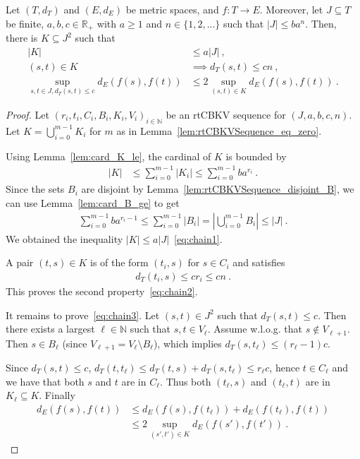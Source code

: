 \begin{lemma}\label{lem:chain}
Let $(T,d_T)$ and $(E,d_E)$ be metric spaces, and $f : T \to E$.
Moreover, let $J \subseteq T$ be finite, $a,b,c \in \mathbb R_+$ with $a \ge 1$ and $n \in \{1, 2, ...\}$ such that $|J| \le b a^n$.
Then, there is $K \subseteq J^2$ such that
\begin{align}
  |K|
  & \le a |J|
  \:, \label{eq:chain1} \\
  (s,t) \in K
  & \implies d_T(s,t) \le c n
  \:, \label{eq:chain2} \\
  \sup_{s,t\in J, d_T(s,t) \le c} d_E(f(s), f(t))
  & \le 2 \sup_{(s,t) \in K} d_E(f(s), f(t))
  \: . \label{eq:chain3}
\end{align}
\end{lemma}

\begin{proof}
Let $(r_i, t_i, C_i, B_i, K_i, V_i)_{i \in \mathbb{N}}$ be an rtCBKV sequence for $(J, a, b, c, n)$.
Let $K = \bigcup_{i=0}^{m-1} K_i$ for $m$ as in Lemma~\ref{lem:rtCBKVSequence_eq_zero}.

Using Lemma~\ref{lem:card_K_le}, the cardinal of $K$ is bounded by
\begin{align*}
  \vert K \vert
  &\le \sum_{i=0}^{m-1} \vert K_i \vert
  \le \sum_{i=0}^{m-1} b a^{r_i}
  \: .
\end{align*}
Since the sets $B_i$ are disjoint by Lemma~\ref{lem:rtCBKVSequence_disjoint_B}, we can use Lemma~\ref{lem:card_B_ge} to get
\begin{align*}
  \sum_{i=0}^{m-1} b a^{r_i - 1}
  \le \sum_{i=0}^{m-1} \vert B_i \vert
  = \left\vert \bigcup_{i=0}^{m-1} B_i \right\vert
  \le \vert J \vert
  \: .
\end{align*}
We obtained the inequality $\vert K \vert \le a \vert J \vert$~\eqref{eq:chain1}.

A pair $(t, s) \in K$ is of the form $(t_i, s)$ for $s \in C_i$ and satisfies
\begin{align*}
  d_T(t_i, s) \le c r_i \le c n \: .
\end{align*}
This proves the second property~\eqref{eq:chain2}.

It remains to prove~\eqref{eq:chain3}.
Let $(s, t) \in J^2$ such that $d_T(s, t) \le c$.
Then there exists a largest $\ell \in \mathbb{N}$ such that $s, t \in V_\ell$.
Assume w.l.o.g. that $s \notin V_{\ell + 1}$. Then $s \in B_\ell$ (since $V_{\ell + 1} = V_\ell \setminus B_\ell$), which implies $d_T(s, t_\ell) \le (r_\ell - 1)c$.

Since $d_T(s, t) \le c$, $d_T(t, t_\ell) \le d_T(t, s) + d_T(s, t_\ell) \le r_\ell c$, hence $t \in C_\ell$ and we have that both $s$ and $t$ are in $C_\ell$.
Thus both $(t_\ell, s)$ and $(t_\ell, t)$ are in $K_\ell \subseteq K$.
Finally
\begin{align*}
  d_E(f(s), f(t))
  &\le d_E(f(s), f(t_\ell)) + d_E(f(t_\ell), f(t))
  \\
  &\le 2\sup_{(s',t') \in K} d_E(f(s'), f(t'))
  \: .
\end{align*}
\end{proof}



